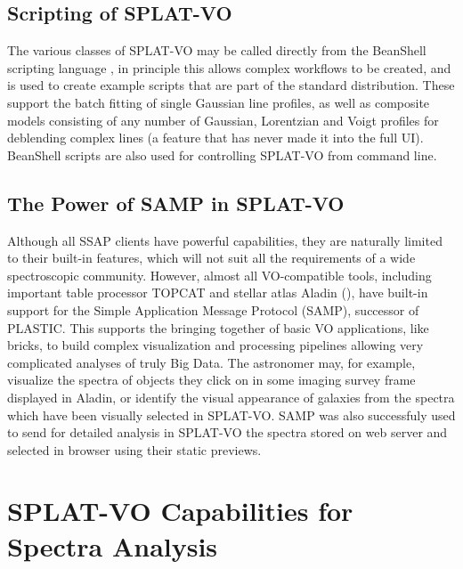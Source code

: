 \documentclass[final,authoryear,5p,times,twocolumn]{elsarticle}
\begin{document}
\subsection{Scripting of SPLAT-VO}

The various classes of SPLAT-VO may be called directly from the BeanShell
scripting language \citep{niemeyer2013learning}, in principle this allows
complex workflows to be created, and is used to create example scripts that
are part of the standard distribution. These support the batch fitting of
single Gaussian line profiles, as well as composite models consisting of any
number of Gaussian, Lorentzian and Voigt profiles for deblending complex lines
(a feature that has never made it into the full UI). BeanShell scripts are
also used for controlling SPLAT-VO from command line.


\subsection{The Power of SAMP in SPLAT-VO}

Although all SSAP clients have powerful capabilities, they are naturally
limited to their built-in features, which will not suit all the requirements
of a wide spectroscopic community. However, almost all VO-compatible tools,
including important table processor TOPCAT and stellar atlas Aladin
(), have built-in support for the Simple Application Message
Protocol (SAMP), successor of PLASTIC. This supports the bringing together of
basic VO applications, like bricks, to build complex visualization and
processing pipelines allowing very complicated analyses of truly Big Data.
The astronomer may, for example, visualize the spectra of objects they click
on in some imaging survey frame displayed in Aladin, or identify the visual
appearance of galaxies from the spectra which have been visually selected in
SPLAT-VO.  SAMP was also successfuly used  to send for detailed analysis in
SPLAT-VO  the spectra stored on web server and selected in browser using
their static previews.

\section{SPLAT-VO Capabilities  for Spectra Analysis}
\end{document}
